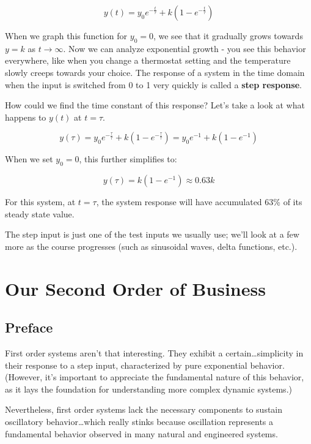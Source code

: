 \documentclass[
  letterpaper,
  DIV=11,
  numbers=noendperiod]{scrreprt}
\begin{document}
\[y(t) = y_0 e^{-\frac{t}{\tau}} + k(1-e^{-\frac{t}{\tau}})\]

When we graph this function for \(y_0 = 0\), we see that it gradually
grows towards \(y=k\) as \(t\to\infty\). Now we can analyze exponential
growth - you see this behavior everywhere, like when you change a
thermostat setting and the temperature slowly creeps towards your
choice. The response of a system in the time domain when the input is
switched from 0 to 1 very quickly is called a \textbf{step response}.

How could we find the time constant of this response? Let's take a look
at what happens to \(y(t)\) at \(t=\tau\).

\[y(\tau) = y_0 e^{-\frac{\tau}{\tau}} + k(1-e^{-\frac{\tau}{\tau}})= y_0 e^{-1} + k(1-e^{-1})\]

When we set \(y_0 = 0\), this further simplifies to:

\[y(\tau) = k(1-e^{-1}) \approx 0.63 k\]

For this system, at \(t=\tau\), the system response will have
accumulated 63\% of its steady state value.

The step input is just one of the test inputs we usually use; we'll look
at a few more as the course progresses (such as sinusoidal waves, delta
functions, etc.).


\hypertarget{our-second-order-of-business}{%
\chapter{Our Second Order of
Business}\label{our-second-order-of-business}}

\hypertarget{preface-1}{%
\section*{Preface}\label{preface-1}}


First order systems aren't that interesting. They exhibit a
certain\ldots simplicity in their response to a step input,
characterized by pure exponential behavior. (However, it's important to
appreciate the fundamental nature of this behavior, as it lays the
foundation for understanding more complex dynamic systems.)

Nevertheless, first order systems lack the necessary components to
sustain oscillatory behavior\ldots which really stinks because
oscillation represents a fundamental behavior observed in many natural
and engineered systems.
\end{document}
